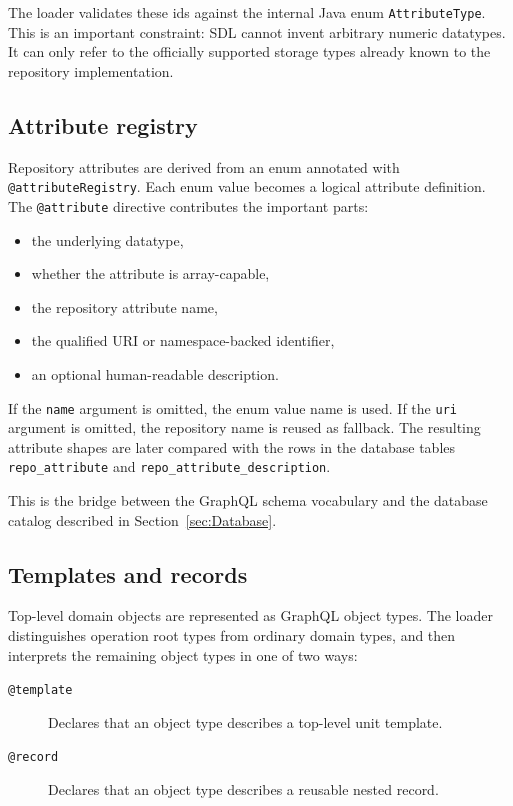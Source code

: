 The loader validates these ids against the internal Java enum \texttt{AttributeType}. This is an important constraint: SDL cannot invent arbitrary numeric datatypes. It can only refer to the officially supported storage types already known to the repository implementation.

\subsection{Attribute registry}

Repository attributes are derived from an enum annotated with \texttt{@attributeRegistry}. Each enum value becomes a logical attribute definition. The \texttt{@attribute} directive contributes the important parts:
\begin{itemize}
\item the underlying datatype,
\item whether the attribute is array-capable,
\item the repository attribute name,
\item the qualified URI or namespace-backed identifier,
\item an optional human-readable description.
\end{itemize}

If the \texttt{name} argument is omitted, the enum value name is used. If the \texttt{uri} argument is omitted, the repository name is reused as fallback. The resulting attribute shapes are later compared with the rows in the database tables \texttt{repo\_attribute} and \texttt{repo\_attribute\_description}.

This is the bridge between the GraphQL schema vocabulary and the database catalog described in Section~\ref{sec:Database}.

\subsection{Templates and records}

Top-level domain objects are represented as GraphQL object types. The loader distinguishes operation root types from ordinary domain types, and then interprets the remaining object types in one of two ways:
\begin{description}
\item[\texttt{@template}] Declares that an object type describes a top-level unit template.
\vspace{.2cm}
\item[\texttt{@record}] Declares that an object type describes a reusable nested record.
\end{description}

